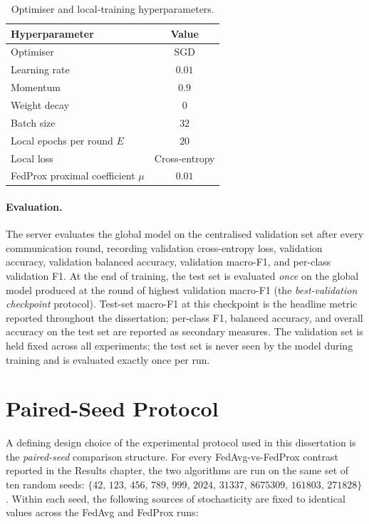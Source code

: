 \documentclass[11pt,a4paper]{report}
\begin{document}
\begin{table}[!htbp]
\centering
\caption{Optimiser and local-training hyperparameters.}
\label{tab:training-hparams}
\small
\begin{tabular}{lc}
\toprule
Hyperparameter & Value \\
\midrule
Optimiser                        & SGD \\
Learning rate                    & $0.01$ \\
Momentum                         & $0.9$ \\
Weight decay                     & $0$ \\
Batch size                       & $32$ \\
Local epochs per round $E$       & $20$ \\
Local loss                       & Cross-entropy \\
FedProx proximal coefficient $\mu$ & $0.01$ \\
\bottomrule
\end{tabular}
\end{table}

\paragraph{Evaluation.}
The server evaluates the global model on the centralised
validation set after every communication round, recording
validation cross-entropy loss, validation accuracy, validation
balanced accuracy, validation macro-F1, and per-class
validation F1. At the end of training, the test set is
evaluated \emph{once} on the global model produced at the
round of highest validation macro-F1 (the
\emph{best-validation checkpoint} protocol). Test-set
macro-F1 at this checkpoint is the headline metric reported
throughout the dissertation; per-class F1, balanced accuracy,
and overall accuracy on the test set are reported as
secondary measures. The validation set is held fixed across
all experiments; the test set is never seen by the model
during training and is evaluated exactly once per run.

\section{Paired-Seed Protocol}
\label{sec:methods-paired-seed}

A defining design choice of the experimental protocol used in
this dissertation is the \emph{paired-seed} comparison
structure. For every FedAvg-vs-FedProx contrast reported in
the Results chapter, the two algorithms are run on the same
set of ten random seeds: $\{42,\, 123,\, 456,\, 789,\, 999,\,
2024,\, 31337,\, 8675309,\, 161803,\, 271828\}$. Within each
seed, the following sources of stochasticity are fixed to
identical values across the FedAvg and FedProx runs:
\end{document}
